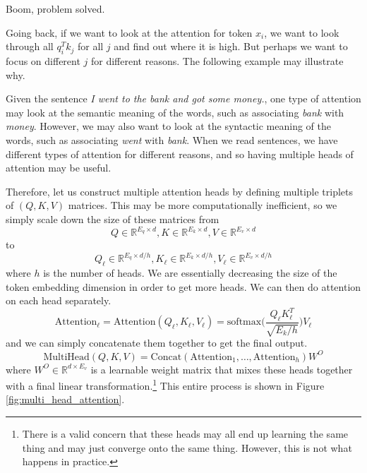       Boom, problem solved. 

      Going back, if we want to look at the attention for token $x_i$, we want to look through all $q_i^T k_j$ for all $j$ and find out where it is high. But perhaps we want to focus on different $j$ for different reasons. The following example may illustrate why. 

      \begin{example}
        Given the sentence \textit{I went to the bank and got some money.}, one type of attention may look at the semantic meaning of the words, such as associating \textit{bank} with \textit{money}. However, we may also want to look at the syntactic meaning of the words, such as associating \textit{went} with \textit{bank}. When we read sentences, we have different types of attention for different reasons, and so having multiple heads of attention may be useful. 
      \end{example}

      \begin{definition}
        Therefore, let us construct multiple attention heads by defining multiple triplets of $(Q, K, V)$ matrices. This may be more computationally inefficient, so we simply scale down the size of these matrices from 
        \[Q \in \mathbb{R}^{E_q \times d}, K \in \mathbb{R}^{E_k \times d}, V \in \mathbb{R}^{E_v \times d}\] 
        to 
        \[Q_\ell \in \mathbb{R}^{E_q \times d/h}, K_\ell \in \mathbb{R}^{E_k \times d/h}, V_\ell \in \mathbb{R}^{E_v \times d/h}\] 
        where $h$ is the number of heads. We are essentially decreasing the size of the token embedding dimension in order to get more heads. We can then do attention on each head separately. 
        \begin{equation} 
          \mathrm{Attention}_\ell = \mathrm{Attention}(Q_\ell, K_\ell, V_\ell) = \mathrm{softmax} \bigg( \frac{Q_\ell K_\ell^T}{\sqrt{E_k/h}} \bigg) V_\ell
        \end{equation}
        and we can simply concatenate them together to get the final output. 
        \[\mathrm{MultiHead}(Q, K, V) = \mathrm{Concat}(\mathrm{Attention}_1, \ldots, \mathrm{Attention}_h) W^O\]
        where $W^O \in \mathbb{R}^{d \times E_v}$ is a learnable weight matrix that mixes these heads together with a final linear transformation.\footnote{There is a valid concern that these heads may all end up learning the same thing and may just converge onto the same thing. However, this is not what happens in practice.} This entire process is shown in Figure \ref{fig:multi_head_attention}. 
      \end{definition}

